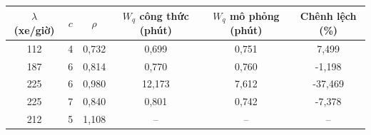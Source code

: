 \begin{tabular}{cccccc}
\toprule
\textbf{$\lambda$ (xe/giờ)} & \textbf{$c$} & \textbf{$\rho$} & \textbf{$W_q$ công thức (phút)} & \textbf{$W_q$ mô phỏng (phút)} & \textbf{Chênh lệch (\%)} \\
\midrule
112 & 4 & 0{,}732 & 0{,}699 & 0{,}751 & 7{,}499 \\
187 & 6 & 0{,}814 & 0{,}770 & 0{,}760 & -1{,}198 \\
225 & 6 & 0{,}980 & 12{,}173 & 7{,}612 & -37{,}469 \\
225 & 7 & 0{,}840 & 0{,}801 & 0{,}742 & -7{,}378 \\
212 & 5 & 1{,}108 & -- & -- & -- \\
\bottomrule
\end{tabular}
